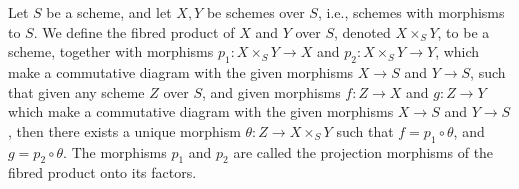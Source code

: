 Let $S$ be a scheme, and let $X, Y$ be schemes over $S$, i.e., schemes with morphisms to $S$. We define the fibred product of $X$ and $Y$ over $S$, denoted $X \times_S Y$, to be a scheme, together with morphisms $p_1: X \times_S Y \rightarrow X$ and $p_2: X \times_S Y \rightarrow Y$, which make a commutative diagram with the given morphisms $X \rightarrow S$ and $Y \rightarrow S$, such that given any scheme $Z$ over $S$, and given morphisms $f: Z \rightarrow X$ and $g: Z \rightarrow Y$ which make a commutative diagram with the given morphisms $X \rightarrow S$ and $Y \rightarrow S$, then there exists a unique morphism $\theta: Z \rightarrow X \times_S Y$ such that $f = p_1 \circ \theta$, and $g = p_2 \circ \theta$. The morphisms $p_1$ and $p_2$ are called the projection morphisms of the fibred product onto its factors.
